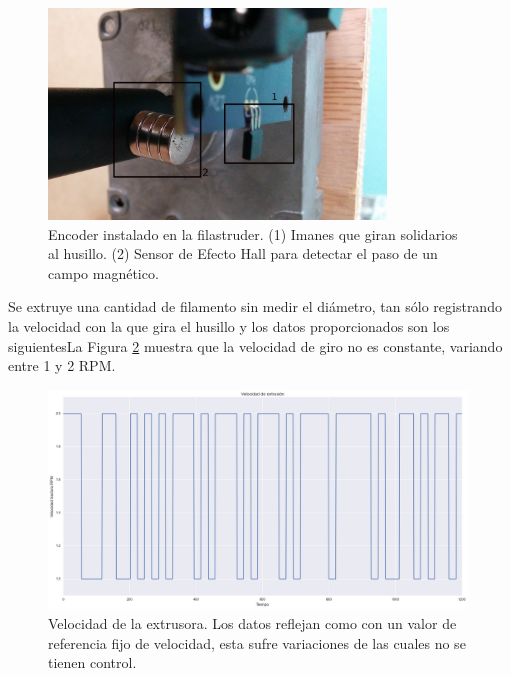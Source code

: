 \begin{figure}[H]
    \centering
    \includegraphics[width=0.8\textwidth]{images/producciones/20072015/IMG_20150721_110502.jpg}
    \caption[Encoder instalado en la filastruder.]{Encoder instalado en la filastruder. (1) Imanes que giran solidarios al husillo. (2) Sensor de Efecto Hall para detectar el paso de un campo magnético.}
    \label{fig:2007105-enc}
\end{figure}

Se extruye una cantidad de filamento sin medir el diámetro, tan sólo registrando la velocidad con la que gira el husillo y los datos proporcionados son los siguientesLa Figura \ref{fig:2007105-grafenc} muestra que la velocidad de giro no es constante, variando entre 1 y 2 RPM. 

\begin{figure}[H]
    \centering
    \includegraphics[width=0.99\textwidth]{images/producciones/20072015/RPM_tract.png}
    \caption[Velocidad de la extrusora]{Velocidad de la extrusora. Los datos reflejan como con un valor de referencia fijo de velocidad, esta sufre variaciones de las cuales no se tienen control.}
    \label{fig:2007105-grafenc}
\end{figure}

